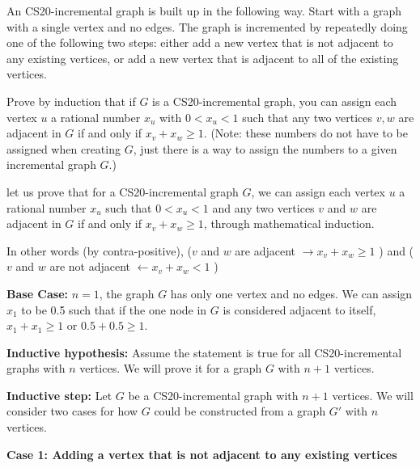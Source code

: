 \documentclass[solution,letterpaper]{cs20}
\begin{document}


    \begin{problem}
        An CS20-incremental graph is built up in the following way.
        Start with a graph with a single vertex and no edges.
        The graph is incremented by repeatedly doing one of the
        following two steps:  either add a new vertex that is not
        adjacent to any existing vertices, or add a new vertex that is
        adjacent to all of the existing vertices.

        Prove by induction that if $G$ is a CS20-incremental graph, you can assign
        each vertex $u$ a rational number $x_u$ with $0 < x_u < 1$ such that
        any two vertices $v,w$ are adjacent in $G$ if and only if $
        x_v+x_w \geq 1$.
        (Note: these numbers do not have to be assigned when creating $G$,
        just there is a way to assign the numbers to a given incremental graph $G$.)

        \begin{solution}
            let us prove that for a CS20-incremental graph \( G \), we can assign each vertex \( u \) a rational number \( x_u \) such that \( 0 < x_u < 1 \) and any two vertices \( v \) and \( w \) are adjacent in \( G \) if and only if \( x_v + x_w \geq 1 \), through mathematical induction.

            In other words (by contra-positive), ($v$ and $w$ are adjacent $\to x_v + x_w \geq 1$ ) and ($v$ and $w$ are not adjacent $\leftarrow x_v + x_w < 1$ )


            \textbf{Base Case:}
            \( n = 1 \), the graph \( G \) has only one vertex and no edges. We can assign \( x_1 \) to be 0.5 such that if the one node in $G$ is considered adjacent to itself, $x_1 + x_1 \geq 1$ or $0.5 + 0.5 \geq 1.$

            \textbf{Inductive hypothesis:}
            Assume the statement is true for all CS20-incremental graphs with \( n \) vertices. We will prove it for a graph \( G \) with \( n+1 \) vertices.

            \textbf{Inductive step:}
            Let \( G \) be a CS20-incremental graph with \( n+1 \) vertices. We will consider two cases for how \( G \) could be constructed from a graph \( G' \) with \( n \) vertices.

            \textbf{Case 1: Adding a vertex that is not adjacent to any existing vertices}


\end{solution}
\end{problem}
\end{document}
